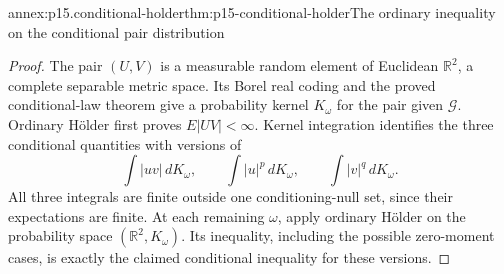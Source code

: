 \begin{annexitem}{annex:p15.conditional-holder}{thm:p15-conditional-holder}{The ordinary inequality on the conditional pair distribution}
\begin{proof}
The pair \((U,V)\) is a measurable random element of Euclidean
\(\mathbb R^2\), a complete separable metric space.
Its Borel real coding and the proved conditional-law theorem give
a probability kernel \(K_\omega\) for the pair given \(\mathcal G\).
Ordinary H\"older first proves \(E|UV|<\infty\).
Kernel integration identifies the three conditional quantities
with versions of
\[
        \int|uv|\,dK_\omega,\qquad
        \int|u|^p\,dK_\omega,\qquad
        \int|v|^q\,dK_\omega .
\]
All three integrals are finite outside one conditioning-null set,
since their expectations are finite.
At each remaining \(\omega\), apply ordinary H\"older on the
probability space \((\mathbb R^2,K_\omega)\).
Its inequality, including the possible zero-moment cases, is
exactly the claimed conditional inequality for these versions.
\end{proof}
\end{annexitem}

